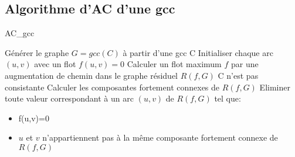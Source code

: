 \documentclass[a4paper,)11pt]{article}
\begin{document}
\subsection*{Algorithme d'AC d'une gcc}
\begin{algorithm}[!h]
\caption{AC\_gcc}
\label{AC_gcc}
\begin{algorithmic}
\STATE Générer le graphe $G=gcc(C)$ à partir d'une gcc C
\STATE Initialiser chaque arc $(u,v)$ avec un flot $f(u,v)=0$
\STATE Calculer un flot maximum $f$ par une augmentation de chemin dans le graphe résiduel $R(f,G)$
\STATE C n'est pas consistante
\ENDIF
\STATE Calculer les composantes fortement connexes de $R(f,G)$
\STATE Eliminer toute valeur correspondant à un arc $(u,v)$ de $R(f,G)$ tel que:
\begin{itemize}
\item f(u,v)=0
\item $u$ et $v$ n'appartiennent pas à la même composante fortement connexe de $R(f,G)$
\end{itemize}
\end{algorithmic}
\end{algorithm}
\end{document}
